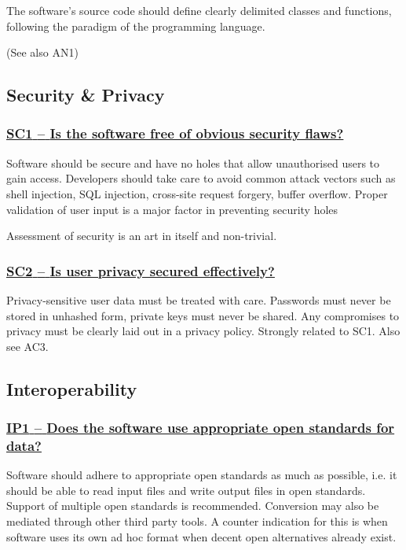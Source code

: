 \documentclass[a4paper,11pt]{article}
\newcommand{\indicator}[1]{\subsubsection*{\underline{#1}}}
\begin{document}
The software's source code should define clearly delimited classes and
functions, following the paradigm of the programming language. 

(See also AN1)

\subsection{Security \& Privacy}\label{sec:sec}

\newcommand{\scOneName}{SC1}
\newcommand{\scOneID}{\scOneName}
\newcommand{\scOneText}{Is the software free of obvious security flaws?}
\indicator{\scOneName{ }--{ }\scOneText}\label{id:sc1} 

Software should be secure and have no holes that allow unauthorised users to
gain access. Developers should take care to avoid common attack vectors such as
shell injection, SQL injection, cross-site request forgery, buffer overflow.
Proper validation of user input is a major factor in preventing security holes

Assessment of security is an art in itself and non-trivial. 

\newcommand{\scTwoName}{SC2}
\newcommand{\scTwoID}{\scTwoName}
\newcommand{\scTwoText}{Is user privacy secured effectively?}
\indicator{\scTwoName{ }--{ }\scTwoText}\label{id:sc2} 

Privacy-sensitive user data must be treated with care. Passwords must never be
stored in unhashed form, private keys must never be shared. Any compromises to
privacy must be clearly laid out in a privacy policy.  Strongly related to SC1.
Also see AC3.

\subsection{Interoperability}\label{sec:int}

\newcommand{\ipOneName}{IP1}
\newcommand{\ipOneID}{\ipOneName}
\newcommand{\ipOneText}{Does the software use appropriate open standards for data?}
\indicator{\ipOneName{ }--{ }\ipOneText}\label{id:ip1} 

Software should adhere to appropriate open standards as much as possible, i.e.
it should be able to read input files and write output files in open
standards. Support of multiple open standards is recommended. Conversion may
also be mediated through other third party tools. A counter indication for this
is when software uses its own ad hoc format when decent open alternatives
already exist.
\end{document}
